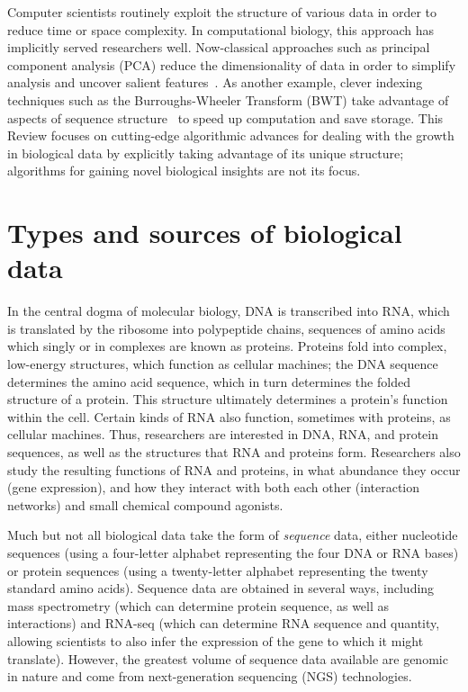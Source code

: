 \documentclass{acm_proc_article-sp}
\begin{document}
Computer scientists routinely exploit the structure of various data in
order to reduce time or space complexity.
In computational biology, this approach has implicitly served researchers well.
Now-classical approaches such as principal component analysis (PCA) reduce the 
dimensionality of data in order to simplify analysis and uncover salient 
features~\cite{berger2013computational}.
As another example, clever indexing techniques such as the Burroughs-Wheeler 
Transform (BWT) take advantage of aspects of sequence 
structure~\cite{berger2013computational} to speed up computation and save storage.
This Review focuses on cutting-edge algorithmic advances for dealing with the growth in 
biological data by explicitly taking advantage of its unique structure; algorithms for gaining novel biological insights are not its 
focus.

\section{Types and sources of biological data}

In the central dogma of molecular biology, DNA is transcribed into RNA, which
is translated by the ribosome into polypeptide chains, sequences of amino 
acids which singly or in complexes are known as proteins.
Proteins fold into complex, low-energy structures, which function as
cellular machines; the DNA sequence determines the amino acid sequence,
which in turn determines the folded structure of a protein.
This structure ultimately determines a protein's function within the cell.
Certain kinds of RNA also function, sometimes with proteins, as cellular 
machines.
Thus, researchers are interested in DNA, RNA, and protein sequences, as well
as the structures that RNA and proteins form.
Researchers also study the resulting functions of RNA and proteins, in what
abundance they occur (gene expression), and how they interact
with both each other (interaction networks) and small chemical compound 
agonists.

Much but not all biological data take the form of \emph{sequence} data, either 
nucleotide sequences (using a four-letter alphabet representing the four 
DNA or RNA bases) or protein sequences (using a twenty-letter alphabet 
representing the twenty standard amino acids).
Sequence data are obtained in several ways, including mass spectrometry (which
can determine protein sequence, as well as interactions) and RNA-seq (which can determine RNA sequence and quantity, 
allowing scientists to also infer the expression of the gene to which it might translate).
However, the greatest volume of sequence data available are genomic in nature and 
come from next-generation sequencing (NGS) technologies.
\end{document}
